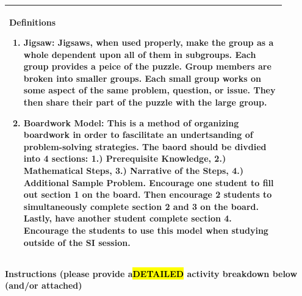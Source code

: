 \documentclass{article}
\begin{document}
\vspace{0.5cm}
\noindent
\begin{tabular}{|p{0.9\linewidth}|}
\hline
{\large\textbf{Definitions}}
\begin{enumerate}
   \item\textbf{Jigsaw:} Jigsaws, when used properly, make the group as a whole dependent upon all of them in subgroups. Each group provides a peice of the puzzle. Group members are broken into smaller groups. Each small group works on some aspect of the same problem, question, or issue. They then share their part of the puzzle with the large group.
   \item\textbf{Boardwork Model:} This is a method of organizing boardwork in order to fascilitate an undertsanding of problem-solving strategies. The baord should be divdied into 4 sections: 1.) Prerequisite Knowledge, 2.) Mathematical Steps, 3.) Narrative of the Steps, 4.) Additional Sample Problem. Encourage one student to fill out section 1 on the board. Then encourage 2 students to simultaneously complete section 2 and 3 on the board. Lastly, have another student complete section 4. Encourage the students to use this model when studying outside of the SI session.
\end{enumerate}
\\ \hline
\end{tabular}
\newpage
{\large\textbf{Instructions (please provide a\hl{DETAILED} activity breakdown below (and/or attached)}}\\
\noindent
\end{document}
